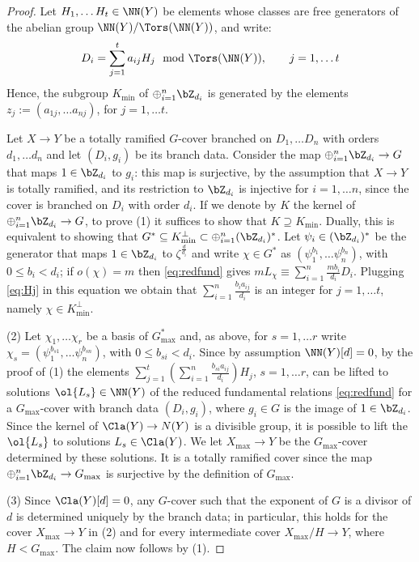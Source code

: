 \documentclass[10pt]{amsart}
\numberwithin{equation}{section}
\begin{document}
\begin{proof} Let $H_1,\dots H_t\in \NN(Y)$ be  elements whose classes are free generators of the abelian group $\NN(Y)/\Tors(\NN(Y))$, and write:
\begin{equation}\label{eq:Hj}
D_i=\sum_{j=1}^t a_{ij}H_j \mod \Tors(\NN(Y)), \qquad j=1,\dots t
\end{equation}
Hence, the subgroup $K_{\min}$ of $\oplus_{i=1}^n \bZ_{d_i}$ is generated by the elements $z_j:=(a_{1j},\dots a_{nj})$, for $j=1,\dots t$. 

Let $X\to Y$ be a totally ramified $G$-cover branched on $D_1,\dots D_n$ with orders $d_1,\dots d_n$ and let $(D_i, g_i)$ be its  branch data. Consider the map $\oplus_{i=1}^n \bZ_{d_i}\to G$ that maps $1\in \bZ_{d_i}$ to $g_i$: this map is surjective, by the assumption that $X\to Y$ is totally ramified, and its restriction to $\bZ_{d_i}$ is injective for $i=1,\dots n$, since the cover is branched  on $D_i$ with order $d_i$. If we denote by $K$ the kernel of $\oplus_{i=1}^n\bZ_{d_i}\to G$, to prove (1) it suffices to show that $K\supseteq K_{\min}$. Dually, this is equivalent to showing that $G^*\subseteq K_{\min}^{\perp}\subset \oplus_{i=1}^n(\bZ_{d_i})^*$. Let $\psi_i\in (\bZ_{d_i})^*$  be the generator that maps $1\in \bZ_{d_i}$ to $\zeta^{\frac {d}{d_i}}$ and write $\chi\in G^*$ as $(\psi_1^{b_1}, \dots \psi_n^{b_n})$, with $0\le b_i< d_i$; if $o(\chi)=m$ then \eqref{eq:redfund} gives $mL_{\chi}\equiv \sum_{i=1}^n \frac {mb_i}{d_i}D_i $. Plugging  \eqref{eq:Hj} in this equation  we obtain that  $\sum_{i=1}^n \frac {b_ia_{ij}}{d_i}$ is an integer for  $j=1,\dots t$, namely $\chi\in K_{\min}^{\perp}$.
\smallskip 

(2) Let  $\chi_1, \dots \chi_r$ be a basis of $G_{\max}^*$ and, as above, for $s=1,\dots r$ write $\chi_s=(\psi_1^{b_{s1}}, \dots \psi_n^{b_{sn}})$, with $0\le b_{si}< d_i$. Since by assumption $\NN(Y)[d]=0$,  by the proof of (1) the elements $\sum_{j=1}^t(\sum_{i=1}^n\frac{ b_{si}a_{ij}}{d_i})H_j$,  $s=1, \dots r$, can be lifted to   solutions $\ol{L_s}\in \NN(Y)$ of the reduced fundamental relations \eqref{eq:redfund}   for a $G_{\max}$-cover with branch data $(D_i, g_i)$, where $g_i\in G$ is the image of $1\in \bZ_{d_i}$. Since the kernel  of $\Cla(Y)\to N(Y)$ is a divisible group,   it is possible to lift the $\ol{L_s}$ to solutions $L_s\in \Cla(Y)$. We let $X_{\max}\to Y$ be the $G_{\max}$-cover determined by these solutions. It is a totally ramified cover since the map $\oplus_{i=1}^n \bZ_{d_i}\to G_{\max}$ is surjective by the definition of $G_{\max}$.
\smallskip

(3) Since $\Cla(Y)[d]=0$,  any $G$-cover such that the exponent of $G$ is a divisor of $d$ is determined uniquely by the branch data; in particular, this holds for the cover $X_{\max}\to Y$ in (2)  and for every intermediate cover $X_{\max}/H\to Y$, where $H<G_{\max}$.  The claim now follows by (1). 
\end{proof}
\end{document}
